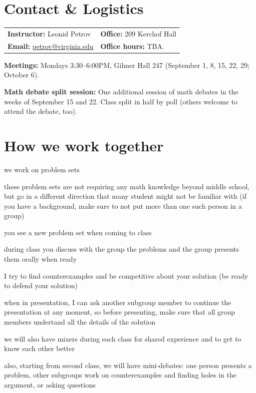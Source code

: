 \documentclass[oneside,11pt]{amsart}
\begin{document}
\newpage
\section{Contact \& Logistics}

\noindent
\begin{tabular}{ll}
\textbf{Instructor:} Leonid Petrov &\qquad \qquad \qquad\textbf{Office:} 209 Kerchof Hall \\
\textbf{Email:} \href{mailto:petrov@virginia.edu}{petrov@virginia.edu} & \qquad \qquad \qquad\textbf{Office hours:} TBA. \\
\end{tabular}

\vspace{4pt}

\noindent\textbf{Meetings:} 
Mondays 3:30--6:00PM, Gilmer Hall 247
(September 1, 8, 15, 22, 29; October 6).

\medskip
\noindent
\textbf{Math debate split session:} One additional session of math debates in the weeks of September 15 and 22. 
Class split in half by poll (others welcome to attend the debate, too).

\section{How we work together}

we work on problem sets 

these problem sets are not requiring any math knowledge beyond middle school, but go in a different direction that many student might not be familiar with (if you have a background, make sure to not put more than one such person in a group)

you see a new problem set when coming to class

during class you discuss with the group the problems and the group presents them orally when ready

I try to find counterexamples and be competitive about your solution (be ready to defend your solution)

when in presentation, I can ask another subgroup member to continue the presentation at any moment, so before presenting, make sure that all group members undertand all the details of the solution

we will also have mixers during each class for shared experience and to get to know each other better


also, starting from second class, we will have mini-debates: one person presents a problem, other subgroups work on counterexamples and finding holes in the argument, or asking questions
\end{document}
